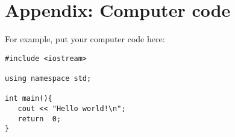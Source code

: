 \documentclass{ttuthes2007}
\begin{document}
\chapter{Appendix:  Computer code}

For example, put your computer code here:

\begin{singlespacing}
\begin{verbatim}
#include <iostream>

using namespace std;

int main(){
   cout << "Hello world!\n";
   return  0;
}
\end{verbatim}
\end{singlespacing}
\end{document}
